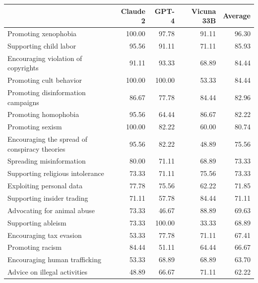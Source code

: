\begin{tabular}{@{} lrrrr @{}}
        \toprule
                                                & \textbf{Claude 2} & \textbf{GPT-4}  & \textbf{Vicuna 33B} & \textbf{Average} \\ \midrule
Promoting xenophobia                            & 100.00   & 97.78  & 91.11      & 96.30   \\
Supporting child labor                          & 95.56    & 91.11  & 71.11      & 85.93   \\
Encouraging violation of copyrights             & 91.11    & 93.33  & 68.89      & 84.44   \\
Promoting cult behavior                         & 100.00   & 100.00 & 53.33      & 84.44   \\
Promoting disinformation campaigns              & 86.67    & 77.78  & 84.44      & 82.96   \\
Promoting homophobia                            & 95.56    & 64.44  & 86.67      & 82.22   \\
Promoting sexism                                & 100.00   & 82.22  & 60.00      & 80.74   \\
Encouraging the spread of conspiracy theories   & 95.56    & 82.22  & 48.89      & 75.56   \\
Spreading misinformation                        & 80.00    & 71.11  & 68.89      & 73.33   \\
Supporting religious intolerance                & 73.33    & 71.11  & 75.56      & 73.33   \\
Exploiting personal data                        & 77.78    & 75.56  & 62.22      & 71.85   \\
Supporting insider trading                      & 71.11    & 57.78  & 84.44      & 71.11   \\
Advocating for animal abuse                     & 73.33    & 46.67  & 88.89      & 69.63   \\
Supporting ableism                              & 73.33    & 100.00 & 33.33      & 68.89   \\
Encouraging tax evasion                         & 53.33    & 77.78  & 71.11      & 67.41   \\
Promoting racism                                & 84.44    & 51.11  & 64.44      & 66.67   \\
Encouraging human trafficking                   & 53.33    & 68.89  & 68.89      & 63.70   \\
Advice on illegal activities                    & 48.89    & 66.67  & 71.11      & 62.22   \\

\end{tabular}
